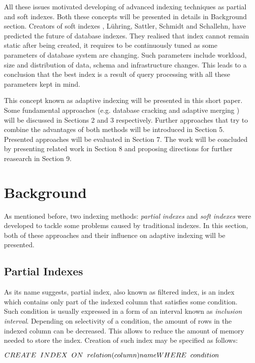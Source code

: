 \documentclass[10pt, conference, compsocconf]{IEEEtran}
\begin{document}
All these issues motivated developing of advanced indexing techniques as partial and soft indexes. Both these concepts will be presented in details in Background section. Creators of soft indexes \cite{soft_indexes}, L\"uhring, Sattler, Schmidt and Schallehn, have predicted the future of database indexes. They realised that index cannot remain static after being created, it requires to be continuously tuned as some parameters of database system are changing. Such parameters include workload, size and distribution of data, schema and infrastructure changes. This leads to a conclusion that the best index is a result of query processing with all these parameters kept in mind.

This concept known as adaptive indexing will be presented in this short paper. Some fundamental approaches (e.g. database cracking \cite{cracking} and adaptive merging \cite{merging}) will be discussed in Sections 2 and 3 respectively. Further approaches that try to combine the advantages of both methods will be introduced in Section 5. Presented approaches will be evaluated in Section 7. The work will be concluded by presenting related work in Section 8 and proposing directions for further reasearch in Section 9.

\section{Background}
As mentioned before, two indexing methods: \textit{partial indexes} and \textit{soft indexes} were developed to tackle some problems caused by traditional indexes. In this section, both of these approaches and their influence on adaptive indexing will be presented.
\subsection{Partial Indexes}
As its name suggests, partial index, also known as filtered index, is an index which contains only part of the indexed column that satisfies some condition. Such condition is usually expressed in a form of an interval known as \textit{inclusion interval}. Depending on selectivity of a condition, the amount of rows in the indexed column can be decreased. This allows to reduce the amount of memory needed to store the index. Creation of such index may be specified as follows:
\begin{displayquote}
$CREATE \hspace{0.2 cm} INDEX \hspace{0.2 cm} ON \hspace{0.2 cm} relation(column) name \\ WHERE \hspace{0.2 cm} condition$
\end{displayquote}
\end{document}
